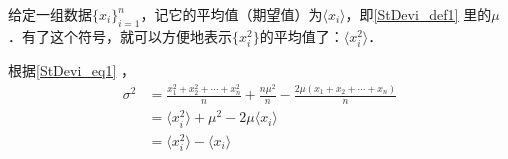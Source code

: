 给定一组数据$\{x_i\}_{i=1}^n$，记它的平均值（期望值）为$\langle x_i \rangle$，即\autoref{StDevi_def1} 里的$\mu$．有了这个符号，就可以方便地表示$\{x_i^2\}$的平均值了：$\langle x_i^2 \rangle$．

根据\autoref{StDevi_eq1} ，
\begin{equation}
\begin{aligned}
\sigma^2 &= \frac{x_1^2+x_2^2+\cdots+x_n^2}{n}+\frac{n\mu^2}{n}-\frac{2\mu(x_1+x_2+\cdots+x_n)}{n}\\
&=\langle x_i^2 \rangle+\mu^2-2\mu\langle x_i \rangle\\
&=\langle x_i^2 \rangle-\langle x_i \rangle
\end{aligned}
\end{equation}




















